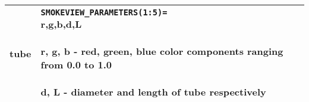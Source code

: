 \begin{longtable}[ht]{|l|l|c|}
tube&
\parbox[c]{\boxwidth}{
{\tt SMOKEVIEW\_PARAMETERS(1:5)=}\\
r,g,b,d,L\\ \\
r, g, b - red, green, blue color components ranging from 0.0 to 1.0 \\ \\
d, L - diameter and length of tube respectively
} &
 \\ \hline


\end{longtable} 